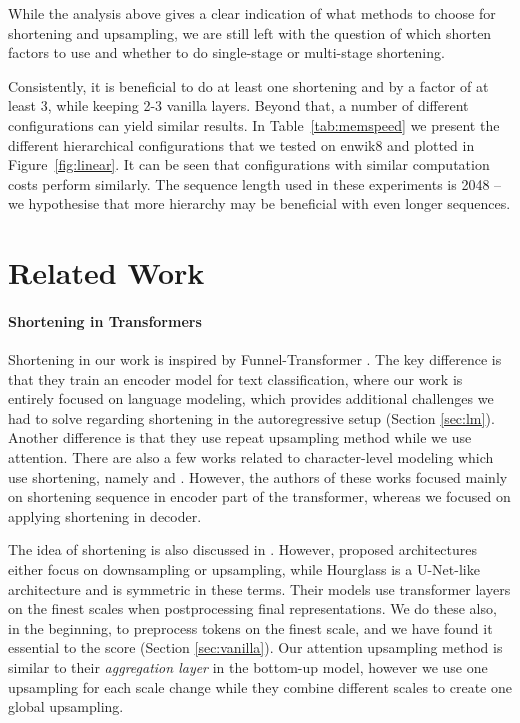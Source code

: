 \documentclass[11pt]{article}
\begin{document}
While the analysis above gives a clear indication of what methods to choose for shortening and upsampling, we are still left with the question of which shorten factors to use and whether to do single-stage or multi-stage shortening. 

Consistently, it is beneficial to do at least one shortening and by a factor of at least 3, while keeping 2-3 vanilla layers. Beyond that, a number of different configurations can yield similar results. In Table~\ref{tab:memspeed} we present the different hierarchical configurations that we tested on enwik8 and plotted in Figure~\ref{fig:linear}. It can be seen that configurations with similar computation costs perform similarly. The sequence length used in these experiments is 2048 -- we hypothesise that more hierarchy may be beneficial with even longer sequences.

\bgroup
\setlength{\parskip}{0.0em}
\section{Related Work}
\paragraph{Shortening in Transformers} Shortening in our work is inspired by Funnel-Transformer \cite{dai2020funneltransformer}. The key difference is that they train an encoder model for text classification, where our work is entirely focused on language modeling, which provides additional challenges we had to solve regarding shortening in the autoregressive setup (Section \ref{sec:lm}). Another difference is that they use repeat upsampling method while we use attention. There are also a few works related to character-level modeling which use shortening, namely \cite{clark2021canine} and \cite{tay2021charformer}. However, the authors of these works focused mainly on shortening sequence in encoder part of the transformer, whereas we focused on applying shortening in decoder.

The idea of shortening is also discussed in \cite{subramanian2020multiscale}. However, proposed architectures either focus on downsampling or upsampling, while Hourglass is a U-Net-like architecture and is symmetric in these terms. Their models use transformer layers on the finest scales when postprocessing final representations. We do these also, in the beginning, to preprocess tokens on the finest scale, and we have found it essential to the score (Section \ref{sec:vanilla}). Our attention upsampling method is similar to their \emph{aggregation layer} in the bottom-up model, however we use one upsampling for each scale change while they combine different scales to create one global upsampling.
\end{document}
